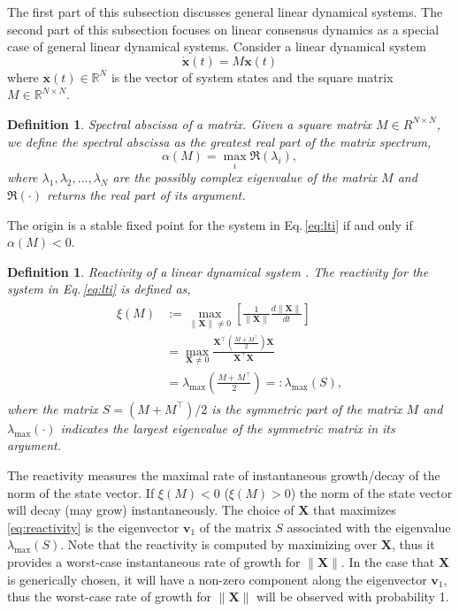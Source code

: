 \documentclass[%
 reprint,
 amsmath,amssymb,
 aip,
]{revtex4-2}
\def \bx {\pmb{x}}
\def \bX {\pmb{X}}
\def \bv {\pmb{v}}
\theoremstyle{italichead}
\newtheorem{definition}[theorem]{Definition}
\theoremstyle{definition}
\newtheorem{remark}{Remark}
\begin{document}
{The first part of this subsection discusses general linear dynamical systems.
The second part of this subsection focuses on linear consensus dynamics as a special case of general linear dynamical systems. 
Consider a linear dynamical system
\begin{equation} \label{eq:lti}
    \dot{\bx} (t) = M \bx(t)
\end{equation}
where $\bx(t) \in \mathbb{R}^N$ is the vector of system states and the square matrix $M \in \mathbb{R}^{N \times N}$.
\begin{definition}{Spectral abscissa of a matrix.} Given a square matrix $M \in R^{N \times N}$, we define the spectral abscissa as the greatest real part of the matrix spectrum,
\begin{equation}
    \alpha(M)=\max_i \Re(\lambda_i),
\end{equation}
where $\lambda_1,\lambda_2,...,\lambda_N$ are the possibly complex eigenvalue of the matrix $M$ and $\Re(\cdot)$ returns the real part of its argument. 
\end{definition}
The origin is a stable fixed point for the system in Eq.\,\eqref{eq:lti} if and only if $\alpha(M) < 0$.

\begin{definition}{Reactivity of a linear dynamical system \cite{Neubert1997ALTERNATIVES}.} The reactivity for the system in Eq.\,\eqref{eq:lti} is defined as,
\begin{align} 
\label{eq:reactivity}
\begin{split}
    \xi\left( M \right) & := \max_{\|  \bX\| \neq 0} \left[ \frac{1}{\|  \bX \|} \frac{d \|  \bX\|}{d t} \right] \\
    & = \max_{  \bX \neq 0} \frac{{\bX}^\top \left( \frac{ M+M^\top}{2} \right) \bX }{{ \bX}^\top  \bX} \\
    & =  \lambda_{\max} \left( \frac{M+M^\top}{2} \right) =:  \lambda_{\max}(S),
\end{split}
\end{align}
where the matrix $S = (M+M^\top)/2$ is the symmetric part of the matrix $M$ and $\lambda_{\max}(\cdot)$ indicates the largest eigenvalue of the symmetric matrix in its argument.
\end{definition}
The reactivity measures the maximal rate of instantaneous growth/decay of the norm of the state vector. 
If $\xi\left( M \right) < 0$ ($\xi\left( M \right) >0$) the norm of the state vector will decay (may grow) instantaneously.
The choice of $\bX$ that maximizes \eqref{eq:reactivity} is the eigenvector $\bv_1$ of the matrix $S$ associated with the eigenvalue $\lambda_{\max}(S)$.
Note that the reactivity is computed by maximizing over $\bX$, thus it provides a worst-case instantaneous rate of growth for $\| \bX \|$. In the case that $\bX$ is generically chosen, it will have a non-zero component along the eigenvector $\bv_1$, thus the worst-case rate of growth for $\| \bX \|$ will be observed with probability 1.

}
\end{document}

